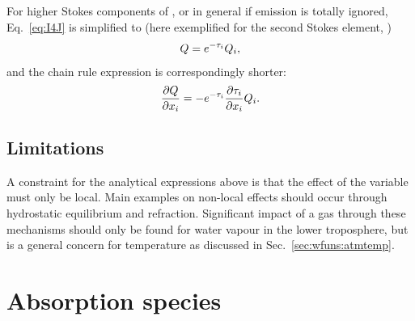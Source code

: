 For higher Stokes components of , or in general if emission is
totally ignored, Eq.~\ref{eq:I4J} is simplified to (here exemplified for the
second Stokes element, \StoQ)
\begin{equation}
  \label{eq:Q4J}
  Q = e^{-\tau_{i}}Q_{i},
\end{equation}
and the chain rule expression is correspondingly shorter:
\begin{equation}
  \frac{\partial Q}{\partial x_{i}} =
   -e^{-\tau_{i}}
   \frac{\partial\tau_{i}}{\partial x_{i}}Q_{i}.
  \label{eq:wfuns:dsdxi2}
\end{equation}


\subsection{Limitations}
\label{sec:wfuns:atmvars:limit}
%
A constraint for the analytical expressions above is that the effect of the
variable must only be local. Main examples on non-local effects should occur
through hydrostatic equilibrium and refraction. Significant impact of a gas
through these mechanisms should only be found for water vapour in the lower
troposphere, but is a general concern for temperature as discussed in
Sec.~\ref{sec:wfuns:atmtemp}.





\section{Absorption species}
\label{sec:wfuns:absspecies}

